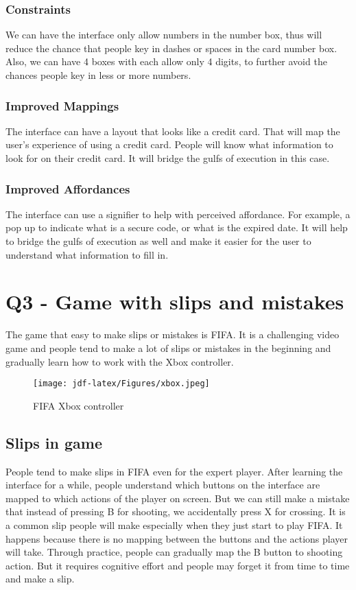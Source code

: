 \documentclass[
	letterpaper, %
]{jdf}
\begin{document}
\subsubsection{Constraints}
We can have the interface only allow numbers in the number box, thus will reduce the chance that people key in dashes or spaces in the card number box. Also, we can have 4 boxes with each allow only 4 digits, to further avoid the chances people key in less or more numbers.

\subsubsection{Improved Mappings}
The interface can have a layout that looks like a credit card. That will map the user's experience of using a credit card. People will know what information to look for on their credit card. It will bridge the gulfs of execution in this case.

\subsubsection{Improved Affordances}
The interface can use a signifier to help with perceived affordance. For example, a pop up to indicate what is a secure code, or what is the expired date. It will help to bridge the gulfs of execution as well and make it easier for the user to understand what information to fill in.

\section{Q3 - Game with slips and mistakes}
The game that easy to make slips or mistakes is FIFA. It is a challenging video game and people tend to make a lot of slips or mistakes in the beginning and gradually learn how to work with the Xbox controller.

\begin{figure}[h]
	\centering
	\texttt{[image: jdf-latex/Figures/xbox.jpeg]}
	\caption{FIFA Xbox controller}
	\label{fig:xbox}
\end{figure}

\subsection{Slips in game}
People tend to make slips in FIFA even for the expert player. After learning the interface for a while, people understand which buttons on the interface are mapped to which actions of the player on screen. But we can still make a mistake that instead of pressing B for shooting, we accidentally press X for crossing. It is a common slip people will make especially when they just start to play FIFA. It happens because there is no mapping between the buttons and the actions player will take. Through practice, people can gradually map the B button to shooting action. But it requires cognitive effort and people may forget it from time to time and make a slip.
\end{document}
